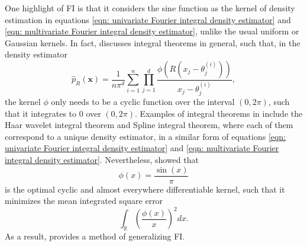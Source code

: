 \documentclass[%
 reprint,
 amsmath,amssymb,
 aps,
]{revtex4-2}
\def\R{\mathbb{R}}
\begin{document}
One highlight of FI is that it considers the sine function as the kernel of density estimation in equations \eqref{eqn: univariate Fourier integral density estimator} and \eqref{eqn: multivariate Fourier integral density estimator}, unlike the usual uniform or Gaussian kernels. In fact, \cite{ho2021integral} discusses integral theorems in general, such that, in the density estimator
\begin{equation} \label{eqn: general integral theorem estimator}
    \hat{p}_R(\mathbf{x}) = \frac{1}{n\pi^d}\sum_{i = 1}^n \prod_{j = 1}^d \frac{\phi(R(x_j - \theta_j^{(i)}))}{x_j - \theta_j^{(i)}},
\end{equation}
the kernel $\phi$ only needs to be a cyclic function over the interval $(0, 2\pi)$, such that it integrates to 0 over $(0, 2\pi)$. Examples of integral theorems in \cite{ho2021integral} include the Haar wavelet integral theorem and Spline integral theorem, where each of them correspond to a unique density estimator, in a similar form of equations \eqref{eqn: univariate Fourier integral density estimator} and \eqref{eqn: multivariate Fourier integral density estimator}. Nevertheless, \cite{ho2021integral} showed that
\begin{equation} \label{eqn: optimal cyclic kernel (sine)}
    \phi(x) = \frac{\sin(x)}{\pi}
\end{equation}
is the optimal cyclic and almost everywhere differentiable kernel, such that it minimizes the mean integrated square error
\begin{equation} \label{eqn: mean integrated square error}
    \int_\R \left(\frac{\phi(x)}{x} \right)^2dx.
\end{equation}
As a result, \cite{ho2021integral} provides a method of generalizing FI.
\end{document}
